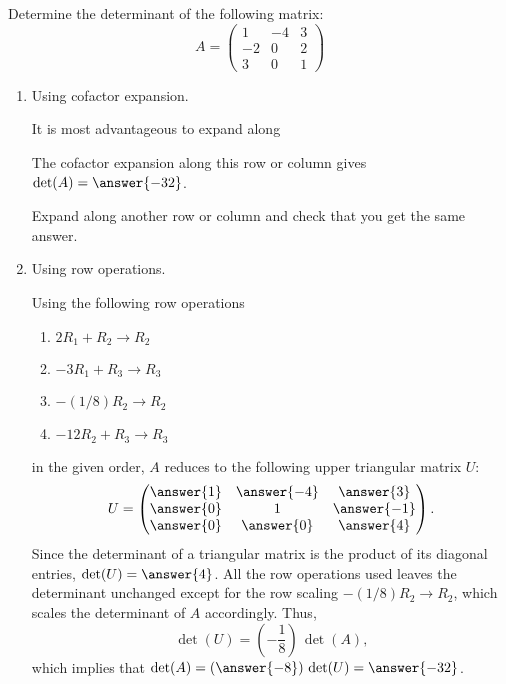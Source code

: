 \documentclass{ximera}
\author{Parisa Fatheddin}
\begin{document}
\begin{exercise}


Determine the determinant of the following matrix:
\[
A= \begin{pmatrix}
1 & -4 & 3\\
-2 & 0 & 2\\
3 & 0 & 1
\end{pmatrix}
\]

\begin{enumerate}
\item Using cofactor expansion.

  \begin{prompt}
    It is most advantageous to expand along
    \begin{multipleChoice}
    \end{multipleChoice}
    The cofactor expansion along this row or column gives $\det(A) =
    \answer{-32}$.
    \begin{feedback}
      Expand along another row or column and check that you get the same answer.
    \end{feedback}
  \end{prompt}

\item Using row operations.

  \begin{prompt}
    Using the following row operations
    \begin{enumerate}
    \item $2R_1 + R_2 \to R_2$
    \item $-3R_1 + R_3 \to R_3$
    \item $-(1/8) R_2 \to R_2$
    \item $-12R_2 + R_3 \to R_3$
    \end{enumerate}
    in the given order, $A$ reduces to the following upper triangular
    matrix $U$:
    \[
      U =
      \begin{pmatrix}
        \answer{1} & \answer{-4} & \answer{3}\\
        \answer{0} & 1 & \answer{-1}\\
        \answer{0} & \answer{0} & \answer{4}
      \end{pmatrix}.
    \]
    Since the determinant of a triangular matrix is the product of its
    diagonal entries, $\det(U) = \answer{4}$. All the row operations
    used leaves the determinant unchanged except for the row scaling
    $-(1/8) R_2 \to R_2$, which scales the determinant of $A$
    accordingly. Thus,
    \[
      \det(U) = \left( -\frac{1}{8} \right) \, \det(A),
    \]
    which implies that $\det(A) = (\answer{-8}) \, \det(U) = \answer{-32}$.


\end{prompt}
\end{enumerate}
\end{exercise}
\end{document}
